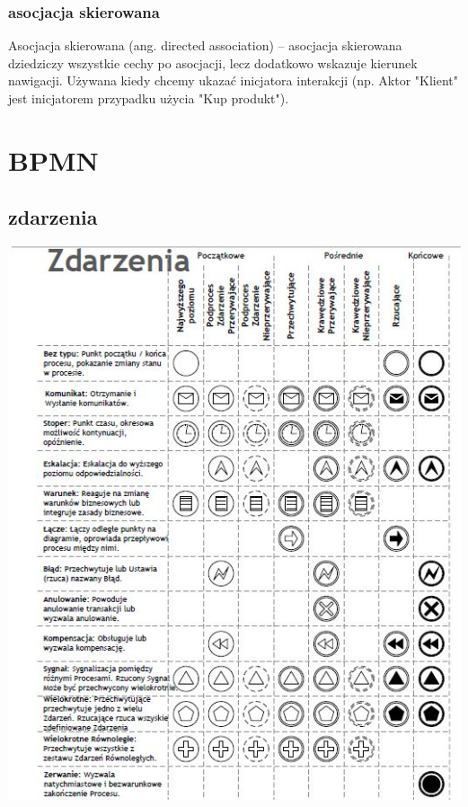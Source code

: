 \documentclass[11pt]{article}
\begin{document}
\subsubsection{asocjacja skierowana}
\label{sec:org6257254}
Asocjacja skierowana (ang. directed association) – asocjacja skierowana dziedziczy wszystkie cechy po asocjacji, lecz dodatkowo wskazuje kierunek nawigacji. Używana kiedy chcemy ukazać inicjatora interakcji (np. Aktor "Klient" jest inicjatorem przypadku użycia "Kup produkt").
\section{BPMN}
\label{sec:org9a493d7}
\subsection{zdarzenia}
\label{sec:org25a2e8a}
\begin{center}
\includegraphics[width=.9\linewidth]{./zdarzenia.png}
\end{center}
\end{document}
